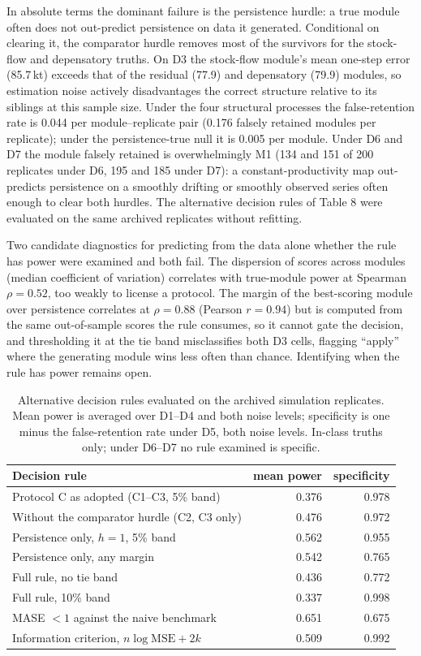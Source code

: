 In absolute terms the dominant failure is the persistence hurdle: a true module often does not out-predict persistence on data it generated. Conditional on clearing it, the comparator hurdle removes most of the survivors for the stock-flow and depensatory truths. On D3 the stock-flow module's mean one-step error (85.7\,kt) exceeds that of the residual (77.9) and depensatory (79.9) modules, so estimation noise actively disadvantages the correct structure relative to its siblings at this sample size. Under the four structural processes the false-retention rate is 0.044 per module--replicate pair (0.176 falsely retained modules per replicate); under the persistence-true null it is 0.005 per module. Under D6 and D7 the module falsely retained is overwhelmingly M1 (134 and 151 of 200 replicates under D6, 195 and 185 under D7): a constant-productivity map out-predicts persistence on a smoothly drifting or smoothly observed series often enough to clear both hurdles. The alternative decision rules of Table 8 were evaluated on the same archived replicates without refitting.

Two candidate diagnostics for predicting from the data alone whether the rule has power were examined and both fail. The dispersion of scores across modules (median coefficient of variation) correlates with true-module power at Spearman $\rho = 0.52$, too weakly to license a protocol. The margin of the best-scoring module over persistence correlates at $\rho = 0.88$ (Pearson $r = 0.94$) but is computed from the same out-of-sample scores the rule consumes, so it cannot gate the decision, and thresholding it at the tie band misclassifies both D3 cells, flagging ``apply'' where the generating module wins less often than chance. Identifying when the rule has power remains open.

\FloatBarrier

\begin{table}[!htb]
\centering\small
\caption{Alternative decision rules evaluated on the archived simulation replicates. Mean power is averaged over D1--D4 and both noise levels; specificity is one minus the false-retention rate under D5, both noise levels. In-class truths only; under D6--D7 no rule examined is specific.}
\label{tab:si_rules}
\begin{tabular}{@{}lrr@{}}
\toprule
Decision rule & mean power & specificity \\
\midrule
Protocol C as adopted (C1--C3, 5\% band) & 0.376 & 0.978 \\
Without the comparator hurdle (C2, C3 only) & 0.476 & 0.972 \\
Persistence only, $h=1$, 5\% band & 0.562 & 0.955 \\
Persistence only, any margin & 0.542 & 0.765 \\
Full rule, no tie band & 0.436 & 0.772 \\
Full rule, 10\% band & 0.337 & 0.998 \\
MASE $<1$ against the naive benchmark & 0.651 & 0.675 \\
Information criterion, $n\log\mathrm{MSE} + 2k$ & 0.509 & 0.992 \\
\bottomrule
\end{tabular}
\end{table}

